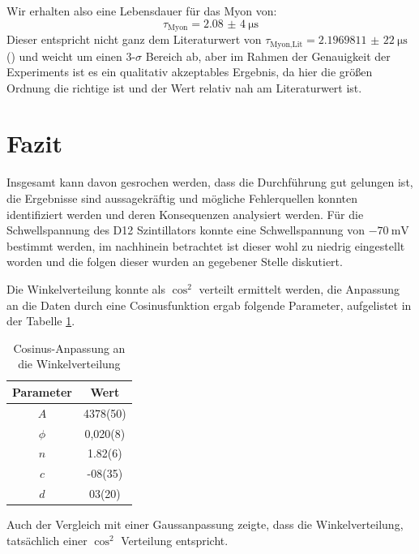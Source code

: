 \documentclass{article}
\begin{document}
Wir erhalten also eine Lebensdauer für das Myon von:
\begin{displaymath}
    \tau_\text{Myon}=\SI{2,08(4)}{\micro\second}
\end{displaymath}
Dieser entspricht nicht ganz dem Literaturwert von $\tau_\text{Myon,Lit}=\SI{2,196 9811(22)}{\micro\s}$ (\cite{Muon}) und weicht um einen $3$-$\sigma$ Bereich ab, aber im Rahmen der 
Genauigkeit der Experiments ist es ein qualitativ akzeptables Ergebnis, da hier die größen Ordnung die richtige ist und der Wert relativ nah am Literaturwert ist.


\section{Fazit}
Insgesamt kann davon gesrochen werden, dass die Durchführung gut gelungen ist, die Ergebnisse sind aussagekräftig und mögliche Fehlerquellen konnten identifiziert werden und deren Konsequenzen analysiert werden.
Für die Schwellspannung des D12 Szintillators konnte eine Schwellspannung von $\SI{-70}{\milli\volt}$ bestimmt werden, im nachhinein betrachtet ist dieser wohl zu niedrig eingestellt worden und die folgen dieser wurden
an gegebener Stelle diskutiert.

Die Winkelverteilung konnte als $\cos^2$ verteilt ermittelt werden, die Anpassung an die Daten durch eine Cosinusfunktion ergab folgende Parameter, aufgelistet in der Tabelle \ref{tab:CosinusAnpassungWinkelverteilungFazit}.
\begin{table}[H]
    \centering
    \caption{Cosinus-Anpassung an die Winkelverteilung}
    \begin{tabular}{|c|c|}
        \hline
        Parameter & Wert \\ \hline \hline
        $A$ & 4378(50) \\ \hline
        $\phi$ & 0,020(8) \\ \hline
        $n$ & 1.82(6) \\ \hline
        $c$ & -08(35) \\ \hline
        $d$ & 03(20) \\ \hline
    \end{tabular}
    \label{tab:CosinusAnpassungWinkelverteilungFazit}
\end{table}
Auch der Vergleich mit einer Gaussanpassung zeigte, dass die Winkelverteilung, tatsächlich einer $\cos^2$ Verteilung entspricht.
\end{document}
